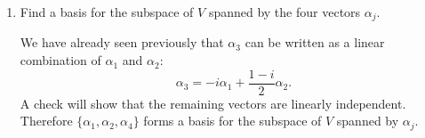 \begin{enumerate}
\item Find a basis for the subspace of $V$ spanned by the four vectors
  $\alpha_j$.
  \begin{solution}
    We have already seen previously that $\alpha_3$ can be written as
    a linear combination of $\alpha_1$ and $\alpha_2$:
    \begin{equation*}
      \alpha_3 = -i\alpha_1 + \frac{1 - i}2\alpha_2.
    \end{equation*}
    A check will show that the remaining vectors are linearly
    independent. Therefore $\{\alpha_1,\alpha_2,\alpha_4\}$ forms a
    basis for the subspace of $V$ spanned by $\alpha_j$.
  \end{solution}
\end{enumerate}
